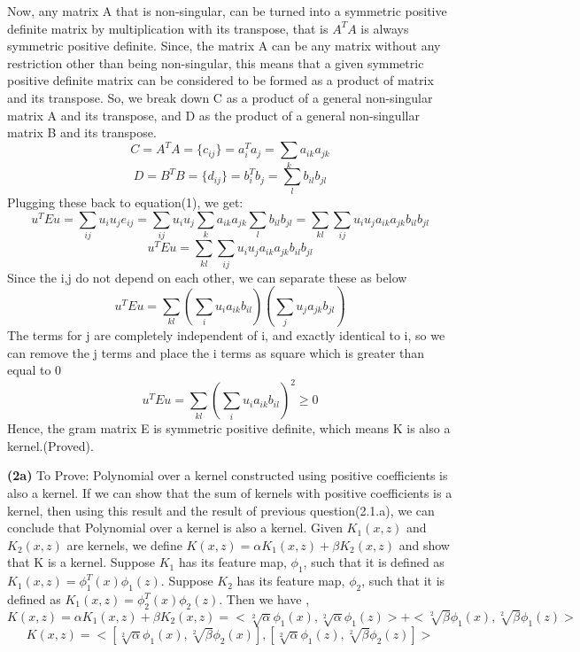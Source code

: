 \documentclass{article}
\renewcommand\part[1]{\vspace{.10in}\textbf{(#1)}}
\begin{document}
    Now, any matrix A that is non-singular, can be turned into a symmetric positive definite matrix by multiplication with its transpose, that is $A^TA$ is always symmetric positive definite. Since, the matrix A can be any matrix without any restriction other than being non-singular, this means that a given symmetric positive definite matrix can be considered to be formed as a product of  matrix and its transpose. So, we break down C as a product of a general non-singular matrix A and its transpose, and D as the product of a general non-singullar matrix B and its transpose. 
    \[C = A^TA = \{c_{ij}\} = a_{i}^Ta_j = \sum_{k} a_{ik}a_{jk} \]
    \[D = B^TB = \{d_{ij}\} = b_{i}^Tb_j = \sum_{l} b_{il}b_{jl} \]
   Plugging these back to equation(1), we get: 
    \[u^TEu = \sum_{ij} u_i u_j e_{ij} = \sum_{ij} u_i u_j \sum_{k} a_{ik}a_{jk} \sum_{l} b_{il}b_{jl} =\sum_{kl} \sum_{ij} u_i u_j a_{ik}a_{jk} b_{il}b_{jl}\] 
    \[u^TEu = \sum_{kl} \sum_{ij} u_i u_j a_{ik} a_{jk} b_{il} b_{jl}\]
    Since the i,j do not depend on each other, we can separate these as below
    \[u^TEu = \sum_{kl} ( \sum_{i} u_i a_{ik} b_{il}) (\sum_{j} u_j a_{jk} b_{jl})\]
    The terms for j are completely independent of i, and exactly identical to i, so we can remove the j terms and place the i terms as square which is greater than equal to 0
    \[u^TEu = \sum_{kl} ( \sum_{i} u_i a_{ik} b_{il})^2 \geq 0\]
    Hence, the gram matrix E is symmetric positive definite, which means K is also a kernel.(Proved). \newline

    \part{2a} To Prove: Polynomial over a kernel constructed using positive coefficients is also a kernel.\newline
    If we can show that the sum of kernels with positive coefficients is a kernel, then using this result and the result of previous question(2.1.a), we can conclude that Polynomial over a kernel is also a kernel. \newline
    Given $K_1(x,z)$ and $K_2(x,z)$ are kernels, we define $K(x,z) = \alpha K_1(x,z) + \beta K_2(x,z)$ and show that K is a kernel. \newline
    Suppose $K_1$ has its feature map, $\phi_1$, such that it is defined as $K_1(x,z) = \phi_1^T(x)\phi_1(z)$.
    Suppose $K_2$ has its feature map, $\phi_2$, such that it is defined as $K_1(x,z) = \phi_2^T(x)\phi_2(z)$. Then we have , \newline
    \[K(x,z) = \alpha K_1(x,z) + \beta K_2(x,z) = <\sqrt[2]{\alpha}\phi_1(x), \sqrt[2]{\alpha}\phi_1(z)> + <\sqrt[2]{\beta}\phi_1(x), \sqrt[2]{\beta}\phi_1(z)>\]
    \[K(x,z) = <[\sqrt[2]{\alpha}\phi_1(x), \sqrt[2]{\beta}\phi_2(x)], [\sqrt[2]{\alpha}\phi_1(z), \sqrt[2]{\beta}\phi_2(z)]>\]
\end{document}
